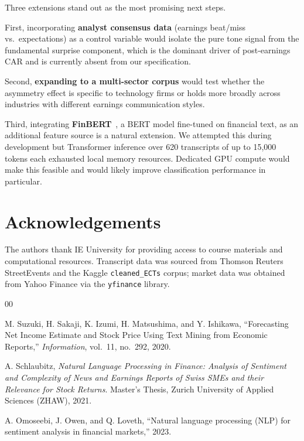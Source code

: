 \documentclass[conference]{IEEEtran}
\begin{document}
Three extensions stand out as the most promising next steps.

First, incorporating \textbf{analyst consensus data} (earnings beat/miss vs.\
expectations) as a control variable would isolate the pure tone signal from the
fundamental surprise component, which is the dominant driver of post-earnings
CAR and is currently absent from our specification.

Second, \textbf{expanding to a multi-sector corpus} would test whether the
asymmetry effect is specific to technology firms or holds more broadly across
industries with different earnings communication styles.

Third, integrating \textbf{FinBERT}~\cite{ref_omoseebi2023}, a BERT model
fine-tuned on financial text, as an additional feature source is a natural
extension. We attempted this during development but Transformer inference over
620 transcripts of up to 15,000 tokens each exhausted local memory resources.
Dedicated GPU compute would make this feasible and would likely improve
classification performance in particular.

\section*{Acknowledgements}

The authors thank IE University for providing access to course materials
and computational resources. Transcript data was sourced from Thomson Reuters
StreetEvents and the Kaggle \texttt{cleaned\_ECTs} corpus; market data was
obtained from Yahoo Finance via the \texttt{yfinance} library.

\begin{thebibliography}{00}

M. Suzuki, H. Sakaji, K. Izumi, H. Matsushima, and Y. Ishikawa,
``Forecasting Net Income Estimate and Stock Price Using Text Mining from
Economic Reports,''
\emph{Information}, vol.~11, no.~292, 2020.

A. Schlaubitz,
\emph{Natural Language Processing in Finance: Analysis of Sentiment and
Complexity of News and Earnings Reports of Swiss SMEs and their Relevance
for Stock Returns}.
Master's Thesis, Zurich University of Applied Sciences (ZHAW), 2021.

A. Omoseebi, J. Owen, and Q. Loveth,
``Natural language processing (NLP) for sentiment analysis in
financial markets,'' 2023.

\end{thebibliography}
\end{document}
